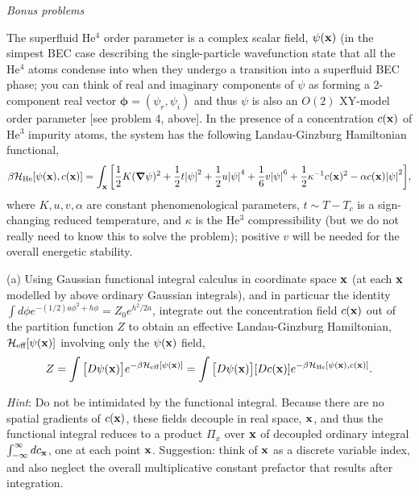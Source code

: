 \documentclass[12pt]{article}
\begin{document}
\newpage
\begin{center}
    \textit{Bonus problems}
\end{center}
\begin{problem}{5}
The superfluid He$^4$ order parameter is a complex scalar field, $\psi(\vb{x})$
(in the simpest BEC case describing the single-particle wavefunction state that
all the He$^4$ atoms condense into when they undergo a transition into a
superfluid BEC phase; you can think of real and imaginary components of $\psi$
as forming a 2-component real vector $\bm\phi=(\psi_r,\psi_i)$ and thus $\psi$
is also an $O(2)$ XY-model order parameter [see problem 4, above]. In the
presence of a concentration $c(\vb{x})$ of He$^3$ impurity atoms, the system has
the following Landau-Ginzburg Hamiltonian functional,
\begin{equation}
    \beta\mathcal{H}_{\text{He}}[\psi(\vb{x}),c(\vb{x})]=\int_{\vb{x}}
    \qty[\frac12K(\grad\psi)^2+\frac12t\abs{\psi}^2+\frac12u\abs{\psi}^4
    +\frac16v\abs{\psi}^6+\frac12\kappa^{-1}c(\vb{x})^2-\alpha
    c(\vb{x})\abs{\psi}^2],
\end{equation}
where $K,u,v,\alpha$ are constant phenomenological parameters, $t\sim T-T_c$ is
a sign-changing reduced temperature, and $\kappa$ is the He$^3$ compressibility
(but we do not really need to know this to solve the problem); positive $v$ will
be needed for the overall energetic stability.

(a) Using Gaussian functional integral calculus in coordinate space $\vb{x}$ (at
each $\vb{x}$ modelled by above ordinary Gaussian integrals), and in particuar
the identity $\int d\phi e^{-(1/2)a\phi^2+h\phi}=Z_0e^{h^2/2a}$, integrate out
the concentration field $c(\vb{x})$ out of the partition function $Z$ to obtain
an effective Landau-Ginzburg Hamiltonian, $\mathcal{H}_{\text{eff}}[\psi(\vb{x})]$ involving
only the $\psi(\vb{x})$ field,
\begin{equation}
    Z=\int\qty[D\psi(\vb{x})]e^{-\beta\mathcal{H}_{\text{eff}}[\psi(\vb{x})]}
    =\int\qty[D\psi(\vb{x})][Dc(\vb{x})]e^{-\beta\mathcal{H}_{\text{He}}[\psi(\vb{x}),c(\vb{x})]}.
\end{equation}

\textit{Hint}: Do not be intimidated by the functional integral. Because there
are no spatial gradients of $c(\vb{x})$, these fields decouple in real space,
$\vb{x}$, and thus the functional integral reduces to a product $\Pi_x$ over
$\vb{x}$ of decoupled ordinary integral $\int_{-\infty}^\infty dc_{\vb{x}}$, one
at each point $\vb{x}$. Suggestion: think of $\vb{x}$ as a discrete variable
index, and also neglect the overall multiplicative constant prefactor that
results after integration.


\end{problem}
\end{document}
